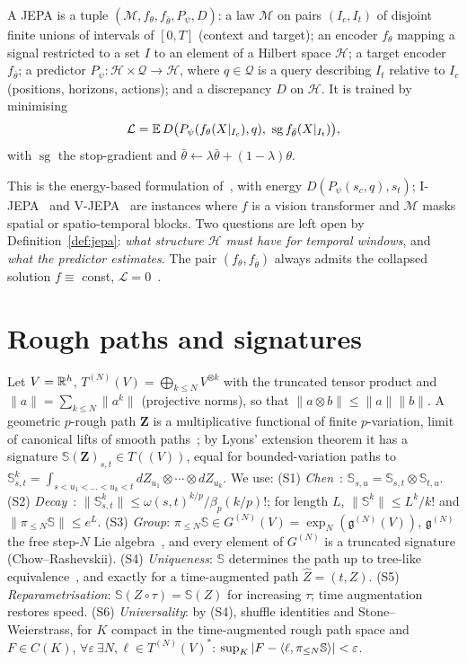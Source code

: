\documentclass[10pt,twocolumn]{article}
\newcommand{\Sig}{\mathbb{S}}
\newcommand{\T}{T^{(N)}}
\newcommand{\G}{G^{(N)}}
\newcommand{\g}{\mathfrak{g}^{(N)}}
\newcommand{\sg}{\operatorname{sg}}
\begin{document}
\begin{definition}[JEPA]\label{def:jepa}
A JEPA is a tuple $(\mathcal M,f_\theta,f_{\bar\theta},P_\psi,D)$: a law $\mathcal M$ on pairs $(I_c,I_t)$ of disjoint finite unions of intervals of $[0,T]$ (context and target); an encoder $f_\theta$ mapping a signal restricted to a set $I$ to an element of a Hilbert space $\mathcal H$; a target encoder $f_{\bar\theta}$; a predictor $P_\psi:\mathcal H\times\mathcal Q\to\mathcal H$, where $q\in\mathcal Q$ is a query describing $I_t$ relative to $I_c$ (positions, horizons, actions); and a discrepancy $D$ on $\mathcal H$. It is trained by minimising
\begin{equation}\label{eq:jepa}
\mathcal L=\E\,D\big(P_\psi(f_\theta(X|_{I_c}),q),\ \sg f_{\bar\theta}(X|_{I_t})\big),
\end{equation}
with $\sg$ the stop-gradient and $\bar\theta\leftarrow\lambda\bar\theta+(1-\lambda)\theta$.
\end{definition}
This is the energy-based formulation of~\cite{lecun2022}, with energy $D(P_\psi(s_c,q),s_t)$; I-JEPA~\cite{assran2023} and V-JEPA~\cite{bardes2024} are instances where $f$ is a vision transformer and $\mathcal M$ masks spatial or spatio-temporal blocks. Two questions are left open by Definition~\ref{def:jepa}: \emph{what structure $\mathcal H$ must have for temporal windows}, and \emph{what the predictor estimates}. The pair $(f_\theta,f_{\bar\theta})$ always admits the collapsed solution $f\equiv$ const, $\mathcal L=0$~\cite{grill2020,tian2021}.

\section{Rough paths and signatures}
Let $V=\mathbb{R}^h$, $\T(V)=\bigoplus_{k\le N}V^{\otimes k}$ with the truncated tensor product and $\|a\|=\sum_{k\le N}\|a^k\|$ (projective norms), so that $\|a\otimes b\|\le\|a\|\|b\|$. A geometric $p$-rough path $\mathbf Z$ is a multiplicative functional of finite $p$-variation, limit of canonical lifts of smooth paths~\cite{lyons1998,friz2010}; by Lyons' extension theorem it has a signature $\Sig(\mathbf Z)_{s,t}\in T((V))$, equal for bounded-variation paths to $\Sig^k_{s,t}=\int_{s<u_1<\dots<u_k<t}dZ_{u_1}\otimes\cdots\otimes dZ_{u_k}$. We use:
(S1) \emph{Chen}~\cite{chen1957}: $\Sig_{s,u}=\Sig_{s,t}\otimes\Sig_{t,u}$.
(S2) \emph{Decay}~\cite{lyons2007}: $\|\Sig^k_{s,t}\|\le\omega(s,t)^{k/p}/\beta_p(k/p)!$; for length $L$, $\|\Sig^k\|\le L^k/k!$ and $\|\pi_{\le N}\Sig\|\le e^L$.
(S3) \emph{Group}: $\pi_{\le N}\Sig\in\G(V)=\exp_N(\g(V))$, $\g$ the free step-$N$ Lie algebra~\cite{reutenauer1993}, and every element of $\G$ is a truncated signature (Chow--Rashevskii).
(S4) \emph{Uniqueness}: $\Sig$ determines the path up to tree-like equivalence~\cite{hambly2010,boedihardjo2016}, and exactly for a time-augmented path $\hat Z=(t,Z)$.
(S5) \emph{Reparametrisation}: $\Sig(Z\circ\tau)=\Sig(Z)$ for increasing $\tau$; time augmentation restores speed.
(S6) \emph{Universality}: by (S4), shuffle identities and Stone--Weierstrass, for $K$ compact in the time-augmented rough path space and $F\in C(K)$, $\forall\varepsilon\ \exists N,\ell\in\T(V)^*$: $\sup_K|F-\ip{\ell}{\pi_{\le N}\Sig}|<\varepsilon$.
\end{document}
